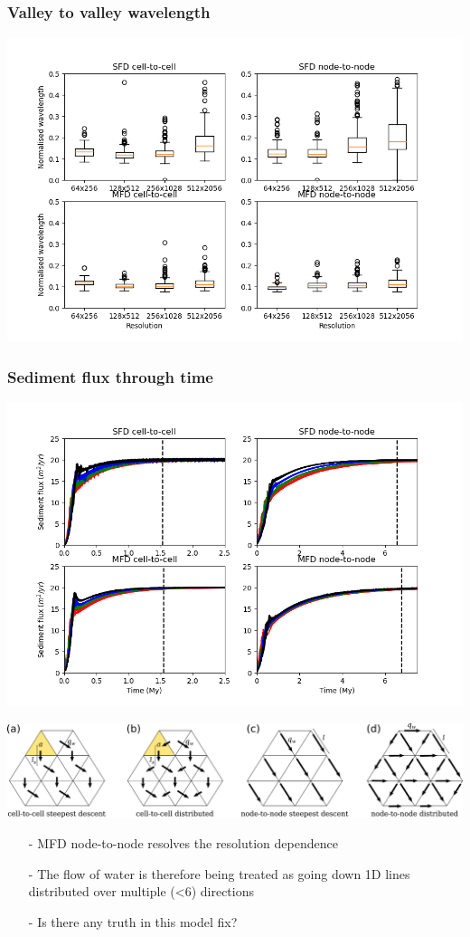 \documentclass[aspectratio=169]{beamer}
\begin{document}
\begin{frame}
    \frametitle{Valley to valley wavelength}
    \includegraphics[height=0.9\paperheight]{./figures/wavelength.png}
\end{frame}

\begin{frame}
    \frametitle{Sediment flux through time}
    \includegraphics[height=0.9\paperheight]{./figures/sediment-flux.png}
\end{frame}

\begin{frame}
    \includegraphics[width=0.8\paperwidth]{./figures/MFDandSFD.png}
    \begin{itemize}
        \item[-]{MFD node-to-node resolves the resolution dependence}
        \item[-]{The flow of water is therefore being treated as going down 1D lines distributed over multiple (<6) directions}
        \item[-]{Is there any truth in this model fix?}
    \end{itemize}
\end{frame}
\end{document}
